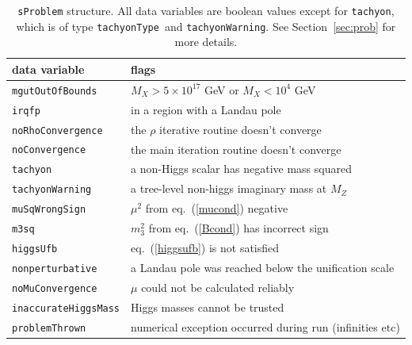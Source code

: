 \documentclass{article}
\def\code#1{\small{\tt #1}\normalsize}
\begin{document}
\begin{table}\begin{center}\begin{tabular}{ll} 
data variable & flags \\ \hline
\code{mgutOutOfBounds} & $M_X>5 \times 10^{17}$ GeV or $M_X<10^4$ GeV\\
\code{irqfp} & in a region with a Landau pole \\
\code{noRhoConvergence} & the $\rho$ iterative routine doesn't converge\\
\code{noConvergence} & the main iteration routine doesn't converge \\ 
\code{tachyon} & a non-Higgs scalar has negative mass squared \\
\code{tachyonWarning} & a tree-level non-higgs imaginary mass at $M_Z$\\
\code{muSqWrongSign} & $\mu^2$ from eq.~(\ref{mucond}) negative \\
\code{m3sq} & $m_3^2$ from eq.~(\ref{Bcond}) has incorrect sign \\
\code{higgsUfb} & eq.~(\ref{higgsufb}) is not satisfied\\
\code{nonperturbative} & a Landau pole was reached below the unification scale
\\
\code{noMuConvergence} & $\mu$ could not be calculated reliably\\
\code{inaccurateHiggsMass} & Higgs masses cannot be trusted\\
\code{problemThrown} & numerical exception occurred during run (infinities etc)\\
\end{tabular}
\caption{\label{table:probs}\code{sProblem} structure. All data variables are boolean values except for
  \code{tachyon}, which is of type \code{tachyonType}~and
  \code{tachyonWarning}. See 
  Section~\protect\ref{sec:prob} for more details.}\end{center}\end{table}
\end{document}
